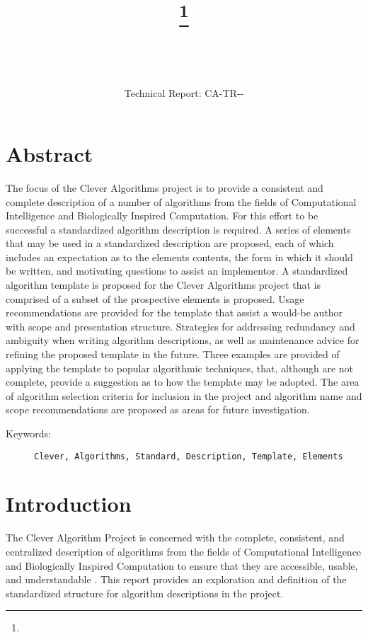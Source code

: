 \documentclass[a4paper, 11pt]{article}
\title{{\myreporttitle}\footnote{\myreportlicense}}
\author{\myreportauthor\\{\myreportemail}\\\small\myreportproject}
\date{\myreportfulldate\\{\small{Technical Report: CA-TR-{\myreportdate}-\myreportversion}}}
\begin{document}
\maketitle

\section*{Abstract} 
The focus of the Clever Algorithms project is to provide a consistent and complete description of a number of algorithms from the fields of Computational Intelligence and Biologically Inspired Computation. For this effort to be successful a standardized algorithm description is required.
A series of elements that may be used in a standardized description are proposed, each of which includes an expectation as to the elements contents, the form in which it should be written, and motivating questions to assist an implementor. 
A standardized algorithm template is proposed for the Clever Algorithms project that is comprised of a subset of the prospective elements is proposed.  
Usage recommendations are provided for the template that assist a would-be author with scope and presentation structure. Strategies for addressing redundancy and ambiguity when writing algorithm descriptions, as well as maintenance advice for refining the proposed template in the future.
Three examples are provided of applying the template to popular algorithmic techniques, that, although are not complete, provide a suggestion as to how the template may be adopted.
The area of algorithm selection criteria for inclusion in the project and algorithm name and scope recommendations are proposed as areas for future investigation.

\begin{description}
	\item[Keywords:] {\small\texttt{Clever, Algorithms, Standard, Description, Template, Elements}}
\end{description} 

\section{Introduction}
\label{sec:introduction}
The Clever Algorithm Project is concerned with the complete, consistent, and centralized description of algorithms from the fields of Computational Intelligence and Biologically Inspired Computation to ensure that they are accessible, usable, and understandable \cite{Brownlee2010}.
This report provides an exploration and definition of the standardized structure for algorithm descriptions in the project.
\end{document}

